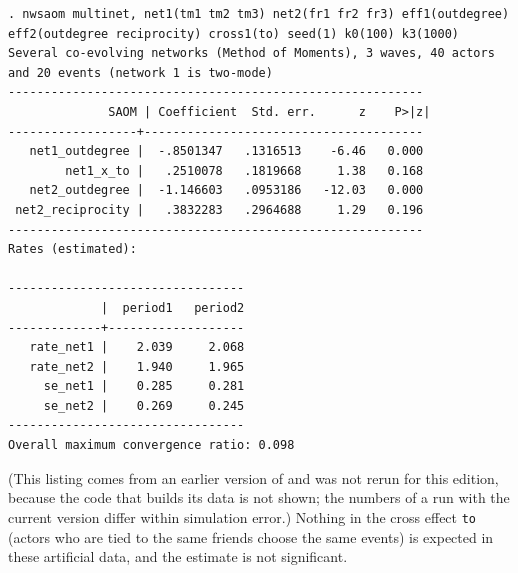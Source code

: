 \begin{lstlisting}
. nwsaom multinet, net1(tm1 tm2 tm3) net2(fr1 fr2 fr3) eff1(outdegree) eff2(outdegree reciprocity) cross1(to) seed(1) k0(100) k3(1000)
Several co-evolving networks (Method of Moments), 3 waves, 40 actors and 20 events (network 1 is two-mode)
----------------------------------------------------------
              SAOM | Coefficient  Std. err.      z    P>|z|
------------------+---------------------------------------
   net1_outdegree |  -.8501347   .1316513    -6.46   0.000
        net1_x_to |   .2510078   .1819668     1.38   0.168
   net2_outdegree |  -1.146603   .0953186   -12.03   0.000
 net2_reciprocity |   .3832283   .2964688     1.29   0.196
----------------------------------------------------------
Rates (estimated):

---------------------------------
             |  period1   period2
-------------+-------------------
   rate_net1 |    2.039     2.068
   rate_net2 |    1.940     1.965
     se_net1 |    0.285     0.281
     se_net2 |    0.269     0.245
---------------------------------
Overall maximum convergence ratio: 0.098
\end{lstlisting}
(This listing comes from an earlier version of \nwsaom{} and was not rerun for this edition, because the code that builds its data is not shown; the numbers of a run with the current version differ within simulation error.)
Nothing in the cross effect \texttt{to} (actors who are tied to the same friends choose the same events) is expected in these artificial data, and the estimate is not significant.

